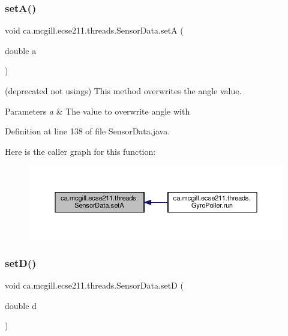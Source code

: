 \subsubsection{\texorpdfstring{set\+A()}{setA()}}
{\footnotesize\ttfamily void ca.\+mcgill.\+ecse211.\+threads.\+Sensor\+Data.\+setA (\begin{DoxyParamCaption}\item[{double}]{a }\end{DoxyParamCaption})}

(deprecated not usings) This method overwrites the angle value.


\begin{DoxyParams}{Parameters}
{\em a} & The value to overwrite angle with \\
\hline
\end{DoxyParams}


Definition at line 138 of file Sensor\+Data.\+java.

Here is the caller graph for this function\+:
\nopagebreak
\begin{figure}[H]
\begin{center}
\leavevmode
\includegraphics[width=350pt]{classca_1_1mcgill_1_1ecse211_1_1threads_1_1_sensor_data_a35b1941d44e86b81eb7c625efbd3c8ba_icgraph}
\end{center}
\end{figure}
\mbox{\label{classca_1_1mcgill_1_1ecse211_1_1threads_1_1_sensor_data_a2c1f8e625478b89aabe6e9911e482ef3}} 
\subsubsection{\texorpdfstring{set\+D()}{setD()}}
{\footnotesize\ttfamily void ca.\+mcgill.\+ecse211.\+threads.\+Sensor\+Data.\+setD (\begin{DoxyParamCaption}\item[{double}]{d }\end{DoxyParamCaption})}


